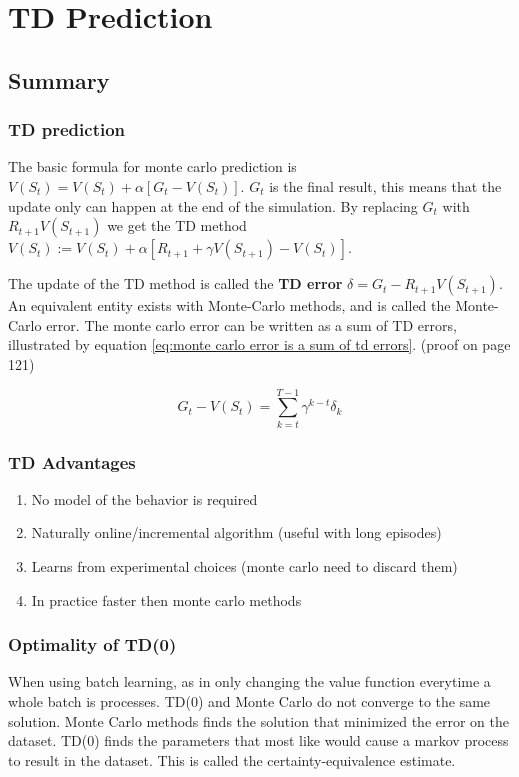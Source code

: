 \chapter{TD Prediction}

\section{Summary}

\subsection{TD prediction}

The basic formula for monte carlo prediction is $V(S_t)=V(S_t)+\alpha [G_t - V(S_t)]$. $G_t$ is the final result, this means that the update only can happen at the end of the simulation. By replacing $G_t$ with $R_{t+1} V(S_{t+1})$ we get the TD method $V(S_t) := V(S_t)+\alpha [R_{t+1} + \gamma V(S_{t+1}) - V(S_t)]$.

The update of the TD method is called the \textbf{TD error} $\delta = G_t - R_{t+1} V(S_{t+1})$. An equivalent entity exists with Monte-Carlo methods, and is called the Monte-Carlo error. The monte carlo error can be written as a sum of TD errors, illustrated by equation \ref{eq:monte carlo error is a sum of td errors}. (proof on page 121)

\begin{equation}
G_t - V(S_t) = \sum_{k=t}^{T-1} \gamma^{k-t} \delta_k
\label{eq:monte carlo error is a sum of td errors}
\end{equation}

\subsection{TD Advantages}

\begin{enumerate}
	\item No model of the behavior is required
	\item Naturally online/incremental algorithm (useful with long episodes)
	\item Learns from experimental choices (monte carlo need to discard them)
	\item In practice faster then monte carlo methods
\end{enumerate}

\subsection{Optimality of TD(0)}
When using batch learning, as in only changing the value function everytime a whole batch is processes. TD(0) and Monte Carlo do not converge to the same solution. Monte Carlo methods finds the solution that minimized the error on the dataset. TD(0) finds the parameters that most like would cause a markov process to result in the dataset. This is called the certainty-equivalence estimate.

